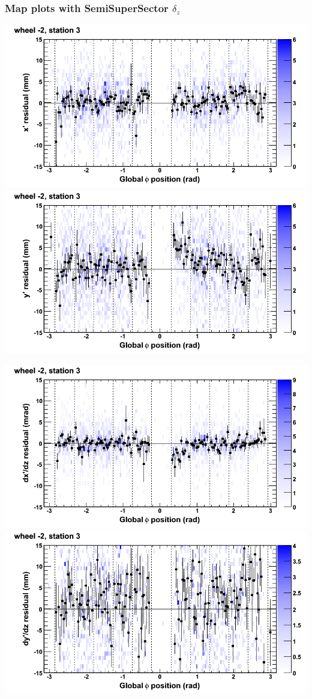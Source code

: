 \documentclass[compress]{beamer}
\begin{document}
\begin{frame}
\frametitle{Map plots with SemiSuperSector $\delta_z$}
\includegraphics[width=0.5\linewidth]{zfit_mapplots/DTvsphi_st3whA_x.png}
\includegraphics[width=0.5\linewidth]{zfit_mapplots/DTvsphi_st3whA_y.png}

\includegraphics[width=0.5\linewidth]{zfit_mapplots/DTvsphi_st3whA_dxdz.png}
\includegraphics[width=0.5\linewidth]{zfit_mapplots/DTvsphi_st3whA_dydz.png}
\end{frame}
\end{document}
